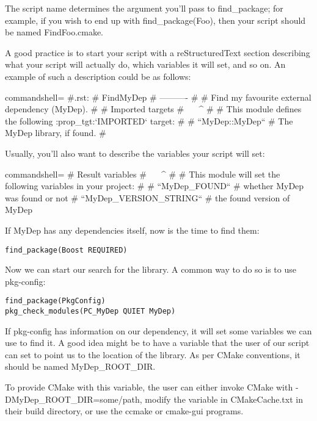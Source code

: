 The script name determines the argument you'll pass to find\_package; for example, if you wish to end up with find\_package(Foo), then your script should be named FindFoo.cmake.

A good practice is to start your script with a reStructuredText section describing what your script will actually do, which variables it will set, and so on. An example of such a description could be as follows:

\begin{tcblisting}{commandshell={}}
 #.rst:
# FindMyDep
# ----------
#
# Find my favourite external dependency (MyDep).
#
# Imported targets
# ^^^^^^^^^^^^^^^^
#
# This module defines the following :prop_tgt:`IMPORTED` target:
#
# ``MyDep::MyDep``
# The MyDep library, if found.
#
\end{tcblisting}

Usually, you'll also want to describe the variables your script will set:

\begin{tcblisting}{commandshell={}}
# Result variables
# ^^^^^^^^^^^^^^^^
#
# This module will set the following variables in your project:
#
# ``MyDep_FOUND``
# whether MyDep was found or not
# ``MyDep_VERSION_STRING``
# the found version of MyDep
\end{tcblisting}

If MyDep has any dependencies itself, now is the time to find them:

\begin{lstlisting}[style=styleCMake]
find_package(Boost REQUIRED)
\end{lstlisting}

Now we can start our search for the library. A common way to do so is to use pkg-config:

\begin{lstlisting}[style=styleCMake]
find_package(PkgConfig)
pkg_check_modules(PC_MyDep QUIET MyDep)
\end{lstlisting}

If pkg-config has information on our dependency, it will set some variables we can use to find it. A good idea might be to have a variable that the user of our script can set to point us to the location of the library. As per CMake conventions, it should be named MyDep\_ROOT\_DIR.

To provide CMake with this variable, the user can either invoke CMake with -DMyDep\_ROOT\_DIR=some/path, modify the variable in CMakeCache.txt in their build directory, or use the ccmake or cmake-gui programs.

